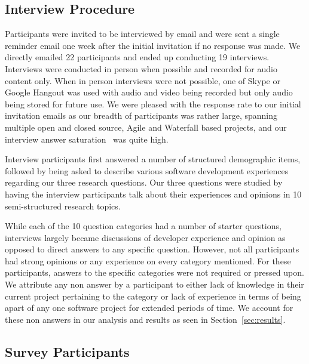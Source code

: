 \documentclass[conference]{IEEEtran}
\newcommand{\totalCategories}{10}
\begin{document}
\subsection{Interview Procedure}

Participants were invited to be interviewed by email and were sent a single reminder email one week
after the initial invitation if no response was made. We directly emailed 22 participants and ended up conducting
19 interviews. Interviews were conducted in person when possible and recorded for audio content only. When in person
interviews were not possible, one of Skype or Google Hangout was used with audio and video being recorded but only
audio being stored for future use. We were pleased with the response rate to our initial invitation emails as
our breadth of participants was rather large, spanning multiple open and closed source, Agile and Waterfall based projects,
and our interview answer saturation~\cite{Guest:2006:SAP} was quite high.

Interview participants first answered a number of structured demographic items, followed by being  
asked to describe various software development experiences regarding our three research questions.
Our three questions were studied by having the interview participants talk about their experiences and opinions in
\totalCategories{} semi-structured research topics.

While each of the \totalCategories{} question categories had a number of starter questions, interviews 
largely became discussions of developer experience and opinion as opposed to direct answers to any specific question.
However, not all participants had strong opinions or any experience on every category mentioned. For these participants, answers 
to the specific categories were not required or pressed upon. We attribute any non answer by a participant to
either lack of knowledge in their current project pertaining to the category or lack of experience in terms of
being apart of any one software project for extended periods of time. We account for these non answers
in our analysis and results as seen in Section~\ref{sec:results}.

\subsection{Survey Participants}
\end{document}
